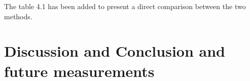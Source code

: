  The table 4.1 has been added to present a direct comparison between the two methods.
\section{Discussion and Conclusion and future measurements}


